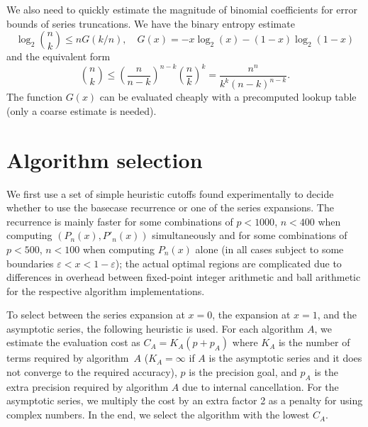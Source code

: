 \documentclass[11pt,a4paper]{article}
\begin{document}
We also need to quickly estimate the magnitude of binomial coefficients
for error bounds of series truncations.
We have the binary entropy estimate
$$\log_2 {n \choose k} \le n G(k/n), \quad G(x) = -x \log_2(x) - (1-x) \log_2(1-x)$$
and the equivalent form
$${n \choose k} \le \left(\frac{n}{n-k}\right)^{n-k} \left(\frac{n}{k}\right)^k = \frac{n^n}{k^k (n-k)^{n-k}}.$$
The function $G(x)$ can be evaluated cheaply with a precomputed
lookup table (only a coarse estimate is needed).

\section{Algorithm selection}

\label{sec:selection}

We first use a set of simple heuristic cutoffs found experimentally to decide whether to use the basecase recurrence or one of the series expansions. The recurrence is mainly faster for some combinations of $p < 1000$, $n < 400$ when computing $(P_n(x), P'_n(x))$ simultaneously and for some combinations of $p < 500$, $n < 100$ when computing $P_n(x)$ alone (in all cases subject to some boundaries $\varepsilon < x < 1 - \varepsilon$); the actual optimal regions are complicated due to differences in overhead between fixed-point integer arithmetic and ball arithmetic for the respective algorithm implementations.

To select between the series expansion at $x = 0$, the expansion at $x = 1$, and the asymptotic series, the following heuristic is used. For each algorithm $A$, we estimate the evaluation cost as $C_A = K_A (p + p_A)$ where $K_A$ is the number of terms required by algorithm~$A$ ($K_A = \infty$ if $A$ is the asymptotic series and it does not converge to the required accuracy), $p$ is the precision goal, and $p_A$ is the extra precision required by algorithm $A$ due to internal cancellation. For the asymptotic series, we multiply the cost by an extra factor 2 as a penalty for using complex numbers. In the end, we select the algorithm with the lowest $C_A$.
\end{document}
